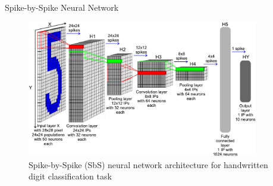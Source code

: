 \begin{frame}{Spike-by-Spike Neural Network}

			\begin{figure}
				\includegraphics[width=0.9\textwidth]{../chapters/sbs_accelerator/figures/sbs_network.pdf} %
				\caption{Spike-by-Spike (SbS) neural network architecture for handwritten digit classification task}
			\end{figure}

\end{frame}

